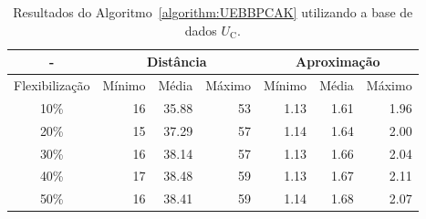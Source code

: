 \begin{table}[!htb]
  \caption{Resultados do Algoritmo~\ref{algorithm:UEBBPCAK} utilizando a base de dados $U_{\text{C}}$.}
  \label{table:BYRVTGIR}
  \centering
  \begin{tabular}{|c|r|r|r|r|r|r|}
    \hline
      -            & \multicolumn{3}{c|}{Distância}             & \multicolumn{3}{c|}{Aproximação}           \\ \hline
    Flexibilização & Mínimo       & Média        & Máximo       & Mínimo       & Média        & Máximo       \\ \hline  
    10\%           & 16           & 35.88        & 53           & 1.13         & 1.61         & 1.96         \\ \hline
    20\%           & 15           & 37.29        & 57           & 1.14         & 1.64         & 2.00         \\ \hline
    30\%           & 16           & 38.14        & 57           & 1.13         & 1.66         & 2.04         \\ \hline
    40\%           & 17           & 38.48        & 59           & 1.13         & 1.67         & 2.11         \\ \hline
    50\%           & 16           & 38.41        & 59           & 1.14         & 1.68         & 2.07         \\ \hline    
  \end{tabular}
\end{table}